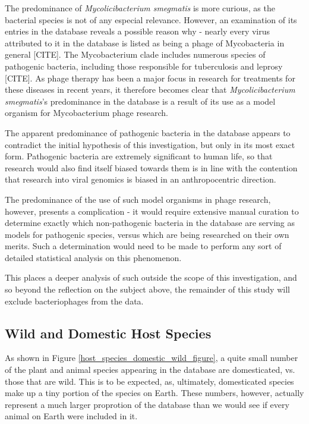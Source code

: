 \documentclass[12pt]{article}
\begin{document}
    The predominance of \emph{Mycolicibacterium smegmatis} is more curious, as the
    bacterial species is not of any especial relevance. However, an examination of 
    its entries in the database reveals a possible reason why - nearly every virus
    attributed to it in the database is listed as being a phage of Mycobacteria in
    general [CITE]. The Mycobacterium clade includes numerous species of pathogenic
    bacteria, including those responsible for tuberculosis and leprosy [CITE]. As 
    phage therapy has been a major focus in research for treatments for these
    diseases in recent years, it therefore becomes clear that
    \emph{Mycolicibacterium smegmatis}'s predominance in the database is a result
    of its use as a model organism for Mycobacterium phage research.
    
    The apparent predominance of pathogenic bacteria in the database appears
    to contradict the initial hypothesis of this investigation, but only in its
    most exact form. Pathogenic bacteria are extremely significant to human life,
    so that research would also find itself biased towards them is in line with
    the contention that research into viral genomics is biased in an
    anthropocentric direction.

    The predominance of the use of such model organisms in phage research,
    however, presents a complication - it would require extensive manual curation
    to determine exactly which non-pathogenic bacteria in the database are serving
    as models for pathogenic species, versus which are being researched on their
    own merits. Such a determination would need to be made to perform any sort of
    detailed statistical analysis on this phenomenon.

    This places a deeper analysis of such outside the scope of this
    investigation, and so beyond the reflection on the subject above, the remainder
    of this study will exclude bacteriophages from the data.

    \subsection{Wild and Domestic Host Species}

    As shown in Figure \ref{host_species_domestic_wild_figure}, a quite small
    number of the plant and animal species appearing in the database are
    domesticated, vs. those that are wild. This is to be expected, as,
    ultimately, domesticated species make up a tiny portion of the species
    on Earth. These numbers, however, actually represent a much larger
    proprotion of the database than we would see if every animal on Earth
    were included in it.
\end{document}

